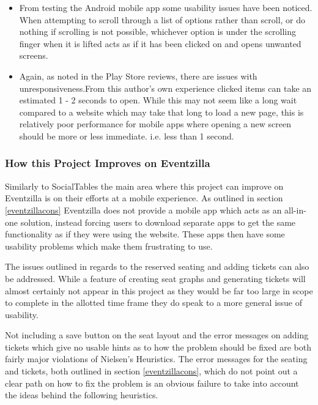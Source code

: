 \begin{itemize}
    \item From testing the Android mobile app some usability issues have been noticed. When attempting to scroll through a list of options rather than scroll, or do nothing if scrolling is not possible, whichever option is under the scrolling finger when it is lifted acts as if it has been clicked on and opens unwanted screens. 
    \item Again, as noted in the Play Store reviews\cite{eventzillaandroidapp}, there are issues with unresponsiveness.From this author's own experience clicked items can take an estimated 1 - 2 seconds to open. While this may not seem like a long wait compared to a website which may take that long to load a new page, this is relatively poor performance for mobile apps where opening a new screen should be more or less immediate. i.e. less than 1 second.
\end{itemize}

\subsubsection{How this Project Improves on Eventzilla}

Similarly to SocialTables the main area where this project can improve on Eventzilla is on their efforts at a mobile experience. As outlined in section \ref{eventzillacons} Eventzilla does not provide a mobile app which acts as an all-in-one solution, instead forcing users to download separate apps to get the same functionality as if they were using the website. These apps then have some usability problems which make them frustrating to use.

The issues outlined in regards to the reserved seating and adding tickets can also be addressed. While a feature of creating seat graphs and generating tickets will almost certainly not appear in this project as they would be far too large in scope to complete in the allotted time frame they do speak to a more general issue of usability. 

Not including a save button on the seat layout and the error messages on adding tickets which give no usable hints as to how the problem should be fixed are both fairly major violations of Nielsen's Heuristics\cite{heuristics}. The error messages for the seating and tickets, both outlined in section \ref{eventzillacons}, which do not point out a clear path on how to fix the problem is an obvious failure to take into account the ideas behind the following heuristics.

